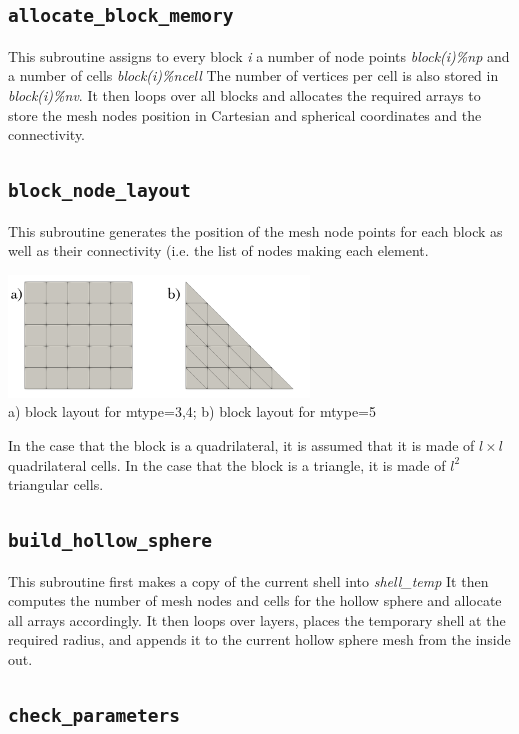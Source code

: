  \subsection{\tt allocate\_block\_memory}
 This subroutine assigns to every block {\sl i} a number of node 
 points {\sl block(i)\%np} and a number of cells {\sl block(i)\%ncell}  
 The number of vertices per cell is also stored in {\sl block(i)\%nv}.
 It then loops over all blocks and allocates the required arrays 
 to store the mesh nodes position in Cartesian and spherical coordinates
 and the connectivity.  
 \subsection{\tt block\_node\_layout}
 This subroutine generates the position of the mesh node points for each 
 block as well as their connectivity (i.e. the list of nodes making 
 each element. 
 \begin{center}
 \includegraphics[width=8cm]{images/basics}\\
 {\small a) block layout for mtype=3,4; b) block layout for mtype=5}
 \end{center}
 In the case that the block is a quadrilateral, it is assumed that 
 it is made of $l \times l$ quadrilateral cells. In the case that the block is a 
 triangle, it is made of $l^2$ triangular cells.
 \subsection{\tt build\_hollow\_sphere}
 This subroutine first makes a copy of the current shell into {\sl shell\_temp}
 It then computes the number of mesh nodes and cells for the hollow sphere
 and allocate all arrays accordingly.
 It then loops over layers, places the temporary shell at the required 
 radius, and appends it to the current hollow sphere mesh from the inside out.
 \subsection{\tt check\_parameters}
 \subsection{\tt }
